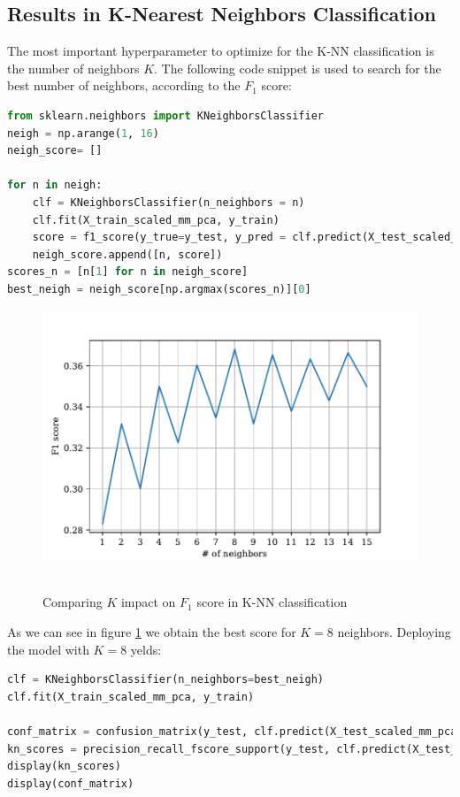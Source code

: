\subsection{Results in K-Nearest Neighbors Classification}
The most important hyperparameter to optimize for the K-NN classification is the number of neighbors \(K\). The following code snippet is used to search for the best number of neighbors, according to the \(F_1\) score:
\begin{lstlisting}[language=Python, caption= Optimizing for number of neighbors]
from sklearn.neighbors import KNeighborsClassifier
neigh = np.arange(1, 16)
neigh_score= []

for n in neigh:
    clf = KNeighborsClassifier(n_neighbors = n)
    clf.fit(X_train_scaled_mm_pca, y_train)
    score = f1_score(y_true=y_test, y_pred = clf.predict(X_test_scaled_mm_pca))
    neigh_score.append([n, score])
scores_n = [n[1] for n in neigh_score]
best_neigh = neigh_score[np.argmax(scores_n)][0]
    \end{lstlisting}

\begin{figure}[htb]
    \centering
    \includegraphics[scale=0.7]{pictures/neigh_score.pdf}\
    \caption{Comparing \(K\) impact on \(F_1\) score in K-NN classification}
    \label{fig_neigh_score}
\end{figure}
As we can see in figure \ref{fig_neigh_score} we obtain the best score for \(K= 8\) neighbors. Deploying the model with \(K= 8\) yelds:
\begin{lstlisting}[language=Python, caption= Deploying K-NN]
clf = KNeighborsClassifier(n_neighbors=best_neigh)
clf.fit(X_train_scaled_mm_pca, y_train)

conf_matrix = confusion_matrix(y_test, clf.predict(X_test_scaled_mm_pca))
kn_scores = precision_recall_fscore_support(y_test, clf.predict(X_test_scaled_mm_pca))
display(kn_scores)
display(conf_matrix)   
\end{lstlisting}

